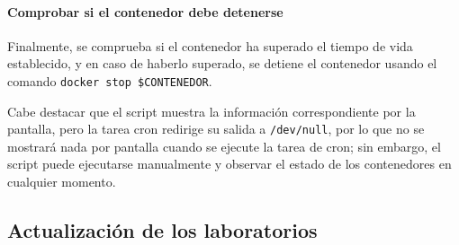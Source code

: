             \paragraph{Comprobar si el contenedor debe detenerse}

                Finalmente, se comprueba si el contenedor ha superado el tiempo de vida establecido, y en caso de haberlo superado, se detiene el contenedor usando el comando \texttt{docker stop \$CONTENEDOR}.

                Cabe destacar que el script muestra la información correspondiente por la pantalla, pero la tarea cron redirige su salida a \texttt{/dev/null}, por lo que no se mostrará nada por pantalla cuando se ejecute la tarea de cron; sin embargo, el script puede ejecutarse manualmente y observar el estado de los contenedores en cualquier momento.

                \newpage

        \subsection{Actualización de los laboratorios}
        
